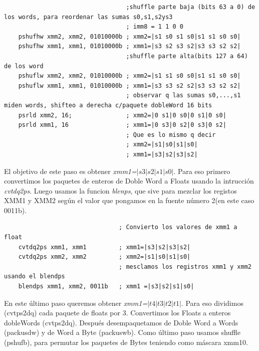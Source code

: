 \begin{codesnippet}
\begin{verbatim}
                                  ;shuffle parte baja (bits 63 a 0) de los words, para reordenar las sumas s0,s1,s2ys3
                                  ; imm8 = 1 1 0 0
    pshufhw xmm2, xmm2, 01010000b ; xmm2=|s1 s0 s1 s0|s1 s1 s0 s0| 
    pshufhw xmm1, xmm1, 01010000b ; xmm1=|s3 s2 s3 s2|s3 s3 s2 s2|
                                  ;shuffle parte alta(bits 127 a 64) de los word
    pshuflw xmm2, xmm2, 01010000b ; xmm2=|s1 s1 s0 s0|s1 s1 s0 s0|
    pshuflw xmm1, xmm1, 01010000b ; xmm1=|s3 s3 s2 s2|s3 s3 s2 s2|
                                  ; observar q las sumas s0,...,s1 miden words, shifteo a derecha c/paquete dobleWord 16 bits
    psrld xmm2, 16;               ; xmm2=|0 s1|0 s0|0 s1|0 s0| 
    psrld xmm1, 16                ; xmm1=|0 s3|0 s2|0 s3|0 s2| 
								  ; Que es lo mismo q decir
                                  ; xmm2=|s1|s0|s1|s0|
                                  ; xmm1=|s3|s2|s3|s2|
\end{verbatim}
\end{codesnippet}

El objetivo de este paso es obtener \emph{xmm1=$|s3|s2|s1|s0|$}. Para eso primero convertimos los paquetes de enteros de Doble Word a Floats usando la intrucción \emph{cvtdq2ps}. Luego usamos la funcion \emph{blenps}, que sive para mezclar los registos XMM1 y XMM2 según el valor que pongamos en la fuente número 2(en este caso 0011b).

\begin{codesnippet}
\begin{verbatim}
                                ; Convierto los valores de xmm1 a float
    cvtdq2ps xmm1, xmm1         ; xmm1=|s3|s2|s3|s2|
    cvtdq2ps xmm2, xmm2         ; xmm2=|s1|s0|s1|s0|
                                ; mesclamos los registros xmm1 y xmm2 usando el blendps
    blendps xmm1, xmm2, 0011b   ; xmm1 =|s3|s2|s1|s0|
\end{verbatim}
\end{codesnippet}

En este último paso queremos obtener \emph{xmm1=$|t4|t3|t2|t1|$}. Para eso dividimos (cvtps2dq) cada paquete de floats por 3. Convertimos los Floats a enteros dobleWords (cvtps2dq). Después desempaquetamos de Doble Word a Words (packusdw) y de Word a Byte (packuswb). Como último paso usamos shuffle (pshufb), para permutar los paquetes de Bytes teniendo como máscara xmm10. 

